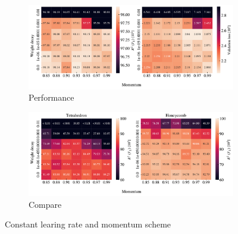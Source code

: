 \begin{figure}[H]
  \centering
  \begin{subfigure}[t]{1.0\textwidth}
      \centering
      \includegraphics[width=\textwidth]{figures/ML/mom_weight_search_constant_perf.pdf}
      \caption{Performance}
  \end{subfigure}
  \hfill
  \begin{subfigure}[t]{1.0\textwidth}
      \centering
      \includegraphics[width=\textwidth]{figures/ML/mom_weight_search_compare_constant_perf.pdf}
      \caption{Compare}
  \end{subfigure}
  \hfill
  \caption{Constant learing rate and momentum scheme}
  \label{fig:mom_weight_search_constant}
\end{figure}

